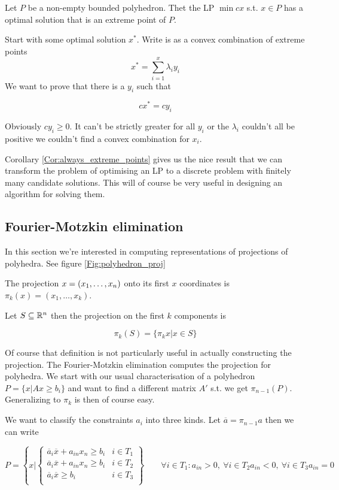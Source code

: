 \begin{cor}\label{Cor:always_extreme_point} Let $P$ be a non-empty bounded polyhedron. Thet the LP $\min cx$ s.t. $x\in P$ has a optimal solution that is an extreme point of $P$.
\end{cor}

\begin{pr} Start with some optimal solution $x^*$. Write is as a convex combination of extreme points 
\[x^* = \sum_{i=1}^x \lambda_i y_i\]
We want to prove that there is a $y_i$ such that

\[cx^* = cy_i\]

Obviously $cy_i\geq 0$. It can't be strictly greater for all $y_i$ or the $\lambda_i$ couldn't all be positive we couldn't find a convex combination for $x_i$. 
\end{pr}

Corollary \ref{Cor:always_extreme_points} gives us the nice result that we can transform the problem of optimising an LP to a discrete problem with finitely many candidate solutions. This will of course be very useful in designing an algorithm for solving them.

\subsection*{Fourier-Motzkin elimination}

In this section we're interested in computing representations of projections of polyhedra. See figure \ref{Fig:polyhedron_proj}

\begin{Def} The projection $x=({x}_1,\ldots,{x}_n)$ onto its first $x$ coordinates is $\pi_k(x) = (x_1,\ldots, x_k)$. 

Let $S\subseteq \mathbb{R}^n$ then the projection on the first $k$ components is

\[\pi_k(S)=\{\pi_k{x}|x\in S\}\]
\end{Def}

Of course that definition is not particularly useful in actually constructing the projection. The Fourier-Motzkin elimination computes the projection for polyhedra. We start with our usual characterisation of a polyhedron $P=\{x|Ax\geq b_i\}$ and want to find a different matrix $A'$ s.t. we get $\pi_{n-1}(P)$. Generalizing to $\pi_k$ is then of course easy.

We want to classify the constraints $a_i$ into three kinds. Let $\overline a = \pi_{n-1}a$ then we can write  

\[P=\left\{x| \begin{cases}
\overline a_i\overline x +a_{in}x_n \geq b_i & i\in T_1\\
\overline a_i\overline x +a_{in}x_n \geq b_i & i\in T_2\\
\overline a_i\overline x \geq b_i & i\in T_3\\
\end{cases}\right\}\qquad \forall i\in T_1: a_{in}>0,\ \forall i\in T_2 a_{in}<0,\ \forall i\in T_3 a_{in}=0 \]

